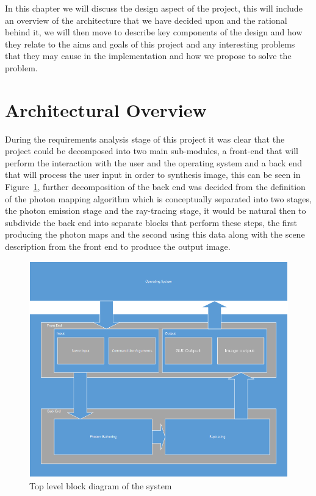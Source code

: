 \label{chap:design}
In this chapter we will discuss the design aspect of the project, this will include an overview of the
architecture that we have decided upon and the rational behind it, we will then move to describe key components of
the design and how they relate to the aims and goals of this project and any interesting problems that they
may cause in the implementation and how we propose to solve the problem.

\section{Architectural Overview}
During the requirements analysis stage of this project it was clear that the project could be decomposed into
two main sub-modules, a front-end that will perform the interaction with the user and the operating system and a
back end that will process the user input in order to synthesis image, this can be seen in 
Figure~\ref{fig:design_blocks}, further decomposition of the back end was decided from the definition of the
photon mapping algorithm which is conceptually separated into two stages, the photon emission stage and the ray-tracing stage, it
would be natural then to subdivide the back end into separate blocks that perform these steps, the first producing the photon
maps and the second using this data along with the scene description from the front end to produce the output image.

\begin{figure}
\centering
\includegraphics[scale=0.75]{./design/TopLevel.png}
\caption{Top level block diagram of the system}
\label{fig:design_blocks}
\end{figure}

\newpage

\newpage

